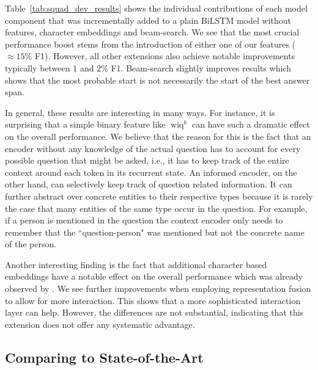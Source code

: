 \documentclass[11pt,a4paper]{article}
\begin{document}
Table~\ref{tab:squad_dev_results} shows the individual contributions of each model component that was incrementally added to a plain BiLSTM model without features, character embeddings and beam-search. We see that the most crucial performance boost stems from the introduction of either one of our features ($\approx15\%$ F1). However, all other extensions also achieve notable improvements typically between $1$ and $2\%$ F1. Beam-search slightly improves results which shows that the most probable start is not necessarily the start of the best answer span.

In general, these results are interesting in many ways. For instance, it is surprising that a simple binary feature like $\operatorname{wiq}^b$ can have such a dramatic effect on the overall performance. We believe that the reason for this is the fact that an encoder without any knowledge of the actual question has to account for every possible question that might be asked, i.e., it has to keep track of the entire context around each token in its recurrent state. An informed encoder, on the other hand, can selectively keep track of question related information. It can further abstract over concrete entities to their respective types because it is rarely the case that many entities of the same type occur in the question. For example, if a person is mentioned in the question the context encoder only needs to remember that the ``question-person" was mentioned but not the concrete name of the person.

Another interesting finding is the fact that additional character based embeddings have a notable effect on the overall performance which was already observed by . We see further improvements when employing representation fusion to allow for more interaction. This shows that a more sophisticated interaction layer can help. However, the differences are not substantial, indicating that this extension does not offer any systematic advantage.


\subsection{Comparing to State-of-the-Art}\label{sec:emp_results}
\end{document}
